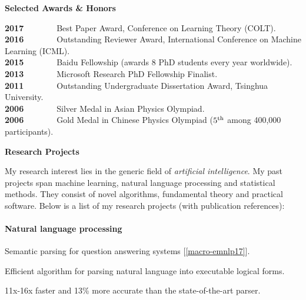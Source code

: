 \documentclass{res} %
\newenvironment{my_item}{
\begin{itemize}
  \setlength{\itemsep}{0pt}
  \setlength{\parskip}{0pt}
  \setlength{\parsep}{0pt}}
{\end{itemize}
}
\begin{document}
\begin{resume}
{\Large\bf Selected Awards \& Honors}

\vspace{-5pt}
\textbf{2017}~~~~~~~~Best Paper Award, Conference on Learning Theory (COLT).\\
\textbf{2016}~~~~~~~~Outstanding Reviewer Award, International Conference on Machine Learning (ICML).\\
\textbf{2015}~~~~~~~~Baidu Fellowship (awards 8 PhD students every year worldwide).\\
\textbf{2013}~~~~~~~~Microsoft Research PhD Fellowship Finalist.\\
\textbf{2011}~~~~~~~~Outstanding Undergraduate Dissertation Award, Tsinghua University.\\
\textbf{2006}~~~~~~~~Silver Medal in Asian Physics Olympiad.\\
\textbf{2006}~~~~~~~~Gold Medal in Chinese Physics Olympiad ($5^{\rm{th}}$ among 400,000 participants).

{\bf\Large Research Projects}

My research interest lies in the generic field of \emph{artificial intelligence}. My past projects span machine learning, natural language processing and statistical methods. They consist of novel algorithms, fundamental theory and practical software. Below is a list of my research projects (with publication references):

\newpage
\vspace{-10pt}
\paragraph{Natural language processing}
\begin{my_item}
\item Semantic parsing for question answering systems [\ref{macro-emnlp17}].
\begin{my_item}
\item Efficient algorithm for parsing natural language into executable logical forms.
\item 11x-16x faster and 13\% more accurate than the state-of-the-art parser.
\end{my_item}
\end{my_item}

\vspace{-10pt}

\end{resume}
\end{document}
